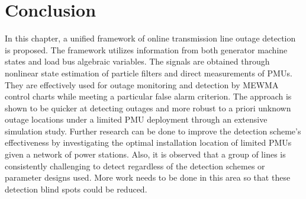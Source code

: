 \section{Conclusion}
\label{ch4:sec:conclusion}
In this chapter, a unified framework of online transmission line outage detection is proposed. The framework utilizes information from both generator machine states and load bus algebraic variables. The signals are obtained through nonlinear state estimation of particle filters and direct measurements of PMUs. They are effectively used for outage monitoring and detection by MEWMA control charts while meeting a particular false alarm criterion. The approach is shown to be quicker at detecting outages and more robust to a priori unknown outage locations under a limited PMU deployment through an extensive simulation study. Further research can be done to improve the detection scheme’s effectiveness by investigating the optimal installation location of limited PMUs given a network of power stations. Also, it is observed that a group of lines is consistently challenging to detect regardless of the detection schemes or parameter designs used. More work needs to be done in this area so that these detection blind spots could be reduced.








